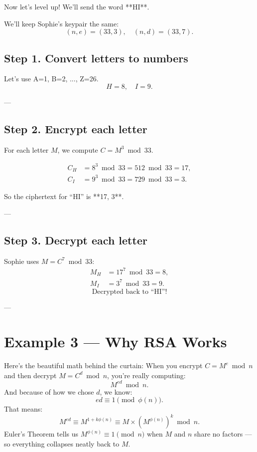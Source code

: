 \documentclass[12pt]{article}
\begin{document}
Now let’s level up!  
We’ll send the word **HI**.  

We’ll keep Sophie’s keypair the same:  
\[
(n, e) = (33, 3), \quad (n, d) = (33, 7).
\]

\subsection*{Step 1. Convert letters to numbers}
Let’s use A=1, B=2, ..., Z=26.  
\[
H = 8, \quad I = 9.
\]

---

\subsection*{Step 2. Encrypt each letter}
For each letter \( M \), we compute \( C = M^3 \bmod 33. \)

\[
\begin{aligned}
C_H &= 8^3 \bmod 33 = 512 \bmod 33 = 17, \\
C_I &= 9^3 \bmod 33 = 729 \bmod 33 = 3.
\end{aligned}
\]

So the ciphertext for “HI” is **17, 3**.

---

\subsection*{Step 3. Decrypt each letter}
Sophie uses \( M = C^7 \bmod 33 \):
\[
\begin{aligned}
M_H &= 17^7 \bmod 33 = 8,\\
M_I &= 3^7 \bmod 33 = 9.
\end{aligned}
\]
\[
\boxed{\text{Decrypted back to “HI”!}}
\]

---

\section*{Example 3 — Why RSA Works}

Here’s the beautiful math behind the curtain:  
When you encrypt \( C = M^e \bmod n \) and then decrypt \( M = C^d \bmod n \),  
you’re really computing:
\[
M^{ed} \bmod n.
\]
And because of how we chose \( d \), we know:
\[
ed \equiv 1 \pmod{\phi(n)}.
\]
That means:
\[
M^{ed} \equiv M^{1 + k\phi(n)} \equiv M \times (M^{\phi(n)})^k \bmod n.
\]
Euler’s Theorem tells us \( M^{\phi(n)} \equiv 1 \pmod{n} \) when \( M \) and \( n \) share no factors —  
so everything collapses neatly back to \( M \).
\end{document}
